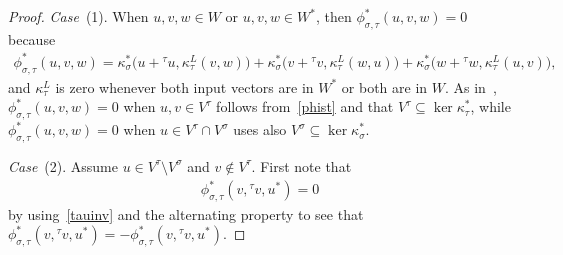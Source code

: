 \documentclass[pdftex]{sigma}
\numberwithin{equation}{section}
\newcommand{\actbylessspace}[1]{{}^{#1}\!}
\newcommand{\kappaLxy}[5]{\kappa^{*}_{#1}\big(#3+{}^{#2}#3,\kappa^L_{#2}(#4,#5)\big)}
\newcommand{\phibulletxy}[5]{\kappaLxy{#1}{#2}{#3}{#4}{#5}+\kappaLxy{#1}{#2}{#4}{#5}{#3}+\kappaLxy{#1}{#2}{#5}{#3}{#4}}
\begin{document}
\begin{proof} \quad

\textit{Case}~(1). When $u,v,w \in W$ or $u,v,w \in W^*$, then $\phi^{*}_{\sigma,\tau}(u,v,w)=0$ because
	\begin{gather}
	\label{phist}
	\phi^{*}_{\sigma,\tau}(u,v,w)=\phibulletxy{\sigma}{\tau}{u}{v}{w},
	\end{gather}
and $\kappa^L_{\tau}$ is zero whenever both
input vectors are in $W^*$ or both are in $W$. As in~\cite{FGK},
$\phi^{*}_{\sigma,\tau}(u,v,w)=0$ when $u, v \in V^{\tau}$ follows from~\eqref{phist}
and that $V^{\tau}\subseteq \ker\kappa^*_{\tau}$, while $\phi^{*}_{\sigma,\tau}(u,v,w)=0$
when $u \in V^{\tau} \cap V^{\sigma}$ uses also $V^{\sigma}\subseteq \ker\kappa^*_{\sigma}$.

\textit{Case}~(2). Assume $u \in V^{\tau} \setminus V^{\sigma}$ and $v \notin V^\tau$.
First note that
	\begin{gather*}
	\phi^*_{\sigma,\tau}(v,\actbylessspace{\tau}v,u^*)=0
	\end{gather*}
by using~\eqref{tauinv}
and the alternating property to see that $\phi^*_{\sigma,\tau}(v,\actbylessspace{\tau}v,u^*)=-\phi^*_{\sigma,\tau}(v,\actbylessspace{\tau}v,u^*)$.
		

\end{proof}
\end{document}
